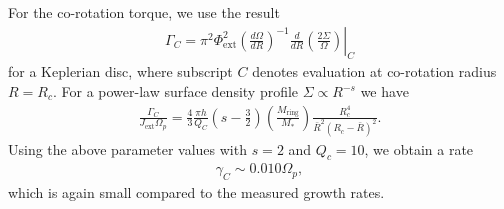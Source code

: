 For the co-rotation torque, we use the result
\begin{align}
  \Gamma_C = \left.
    \pi^2\Phi_\mathrm{ext}^2\left(\frac{d\Omega}{dR}\right)^{-1}\frac{d}{dR}\left(\frac{2\Sigma}{\Omega}\right)\right|_{C}
\end{align}
for a Keplerian disc, where subscript $C$ denotes evaluation at
co-rotation radius $R=R_c$. For a power-law surface density profile
$\Sigma\propto R^{-s}$ we have
\begin{align}
  \frac{\Gamma_C}{J_\mathrm{ext}\Omega_p} = \frac{4}{3}\frac{\pi h}{Q_C} \left(s -
    \frac{3}{2}\right)\left(\frac{M_\mathrm{ring}}{M_*}\right)\frac{R_c^4}{\bar{R}^2\left(R_c
      - \bar{R}\right)^2}.   
\end{align}
Using the above parameter values with $s=2$ and $Q_c=10$, we obtain a
rate
\begin{align}
  \gamma_C\sim 0.010\Omega_p,
\end{align}
which is again small compared to the measured growth rates. 






